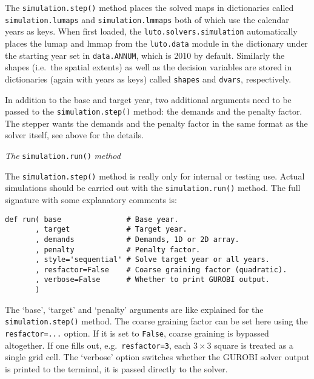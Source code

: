 \documentclass{draft}
\begin{document}
The \texttt{simulation.step()} method places the solved maps in dictionaries called \texttt{simulation.lumaps} and \texttt{simulation.lmmaps} both of which use the calendar years as keys. When first loaded, the \texttt{luto.solvers.simulation} automatically places the lumap and lmmap from the \texttt{luto.data} module in the dictionary under the starting year set in \texttt{data.ANNUM}, which is 2010 by default. Similarly the shapes (i.e.\ the spatial extents) as well as the decision variables are stored in dictionaries (again with years as keys) called \texttt{shapes} and \texttt{dvars}, respectively.

In addition to the base and target year, two additional arguments need to be passed to the \texttt{simulation.step()} method: the demands and the penalty factor. The stepper wants the demands and the penalty factor in the same format as the solver itself, see above for the details.

\emph{The} \texttt{simulation.run()} \emph{method}

The \texttt{simulation.step()} method is really only for internal or testing use. Actual simulations should be carried out with the \texttt{simulation.run()} method. The full signature with some explanatory comments is:

\begin{verbatim}
def run( base               # Base year.
       , target             # Target year.
       , demands            # Demands, 1D or 2D array.
       , penalty            # Penalty factor.
       , style='sequential' # Solve target year or all years.
       , resfactor=False    # Coarse graining factor (quadratic).
       , verbose=False      # Whether to print GUROBI output.
       )
\end{verbatim}

The `base', `target' and `penalty' arguments are like explained for the \texttt{simulation.step()} method. The coarse graining factor can be set here using the \texttt{resfactor=...} option. If it is set to \texttt{False}, coarse graining is bypassed altogether. If one fills out, e.g.\ \texttt{resfactor=3}, each $3 \times 3$ square is treated as a single grid cell. The `verbose' option switches whether the GUROBI solver output is printed to the terminal, it is passed directly to the solver.
\end{document}
